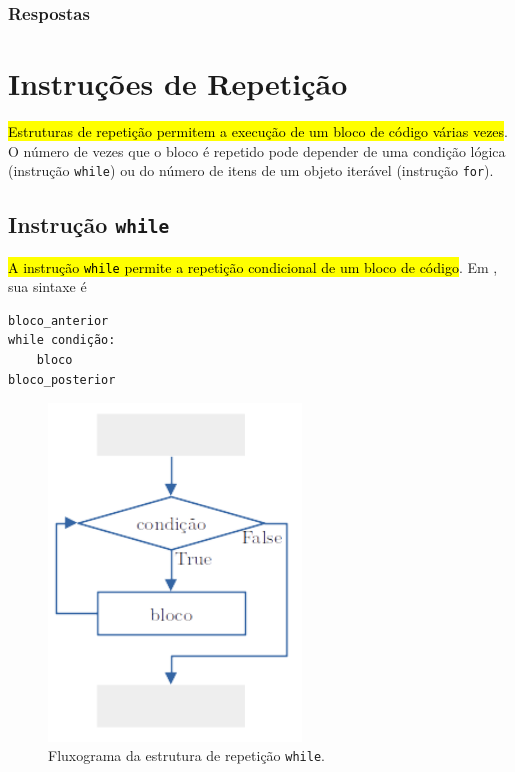 \ifisbook
\subsubsection{Respostas}
\shipoutAnswer
\fi


\section{Instruções de Repetição}\label{cap_progest_sec_repete}

\hl{Estruturas de repetição permitem a execução de um bloco de código várias vezes}. O número de vezes que o bloco é repetido pode depender de uma condição lógica (instrução \lstinline+while+) ou do número de itens de um objeto iterável (instrução \lstinline+for+).

\subsection{Instrução \texttt{while}}

\hl{A instrução \texttt{while} permite a repetição condicional de um bloco de código}. Em {\python}, sua sintaxe é

\begin{lstlisting}
bloco_anterior
while condição:
    bloco
bloco_posterior
\end{lstlisting}

\begin{figure}[H]
  \centering
  \includegraphics[width=0.6\textwidth]{./cap_progest/dados/fig_fg_while/fig}
  \caption{Fluxograma da estrutura de repetição \lstinline+while+.}
  \label{fig:cap_progest_sec_repete:fig:fg_while}
\end{figure}

